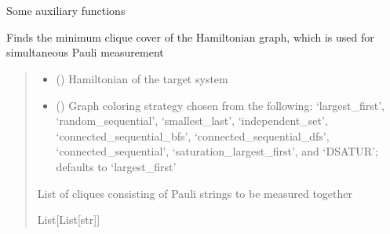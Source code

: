 \documentclass[letterpaper,10pt,english]{sphinxmanual}
\begin{document}
\sphinxstepscope


\section{}
\label{\detokenize{qcompute_qapp.utils:module-qcompute_qapp.utils}}\label{\detokenize{qcompute_qapp.utils:qcompute-qapp-utils}}\label{\detokenize{qcompute_qapp.utils::doc}}
\sphinxAtStartPar
Some auxiliary functions

\begin{fulllineitems}
\label{\detokenize{qcompute_qapp.utils:qcompute_qapp.utils.grouping_hamiltonian}}
\pysigstartsignatures
{}
\pysigstopsignatures
\sphinxAtStartPar
Finds the minimum clique cover of the Hamiltonian graph, which is used for simultaneous Pauli measurement
\begin{quote}\begin{description}
\begin{itemize}
\item {} 
\sphinxAtStartPar
{} () \textendash{} Hamiltonian of the target system

\item {} 
\sphinxAtStartPar
{} () \textendash{} Graph coloring strategy chosen from the following: ‘largest\_first’, ‘random\_sequential’,
‘smallest\_last’, ‘independent\_set’, ‘connected\_sequential\_bfs’, ‘connected\_sequential\_dfs’, ‘connected\_sequential’,
‘saturation\_largest\_first’, and ‘DSATUR’; defaults to ‘largest\_first’

\end{itemize}

\sphinxAtStartPar
List of cliques consisting of Pauli strings to be measured together

\sphinxAtStartPar
List{[}List{[}str{]}{]}

\end{description}\end{quote}

\end{fulllineitems}
\end{document}
